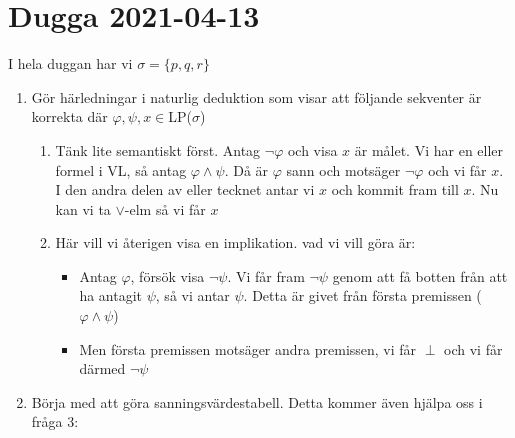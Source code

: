 \section{Dugga 2021-04-13}
\par\bigskip
\noindent I hela duggan har vi $\sigma=\{p, q, r\}$
\par\bigskip

\begin{enumerate}
  \item Gör härledningar i naturlig deduktion som visar att följande sekventer är korrekta där $\varphi,\psi,x\in$LP($\sigma$) 

    \begin{enumerate}

      \item Tänk lite semantiskt först. Antag $\neg \varphi$ och visa $x$ är målet. Vi har en eller formel i VL, så antag $\varphi\wedge\psi$. Då är $\varphi$ sann och motsäger $\neg \varphi$ och vi får $x$. I den andra delen av eller tecknet antar vi $x$ och kommit fram till $x$. Nu kan vi ta $\vee$-elm så vi får $x$
        \par\bigskip

      \item Här vill vi återigen visa en implikation. vad vi vill göra är:
        \begin{itemize}
          \item Antag $\varphi$, försök visa $\neg\psi$. Vi får fram $\neg\psi$ genom att få botten från att ha antagit $\psi$, så vi antar $\psi$. Detta är givet från första premissen ($\varphi\wedge\psi$)
          \item Men första premissen motsäger andra premissen, vi får $\perp$ och vi får därmed $\neg\psi$
        \end{itemize}
    \end{enumerate}
    \par\bigskip

  \item Börja med att göra sanningsvärdestabell. Detta kommer även hjälpa oss i fråga 3:


\end{enumerate}

